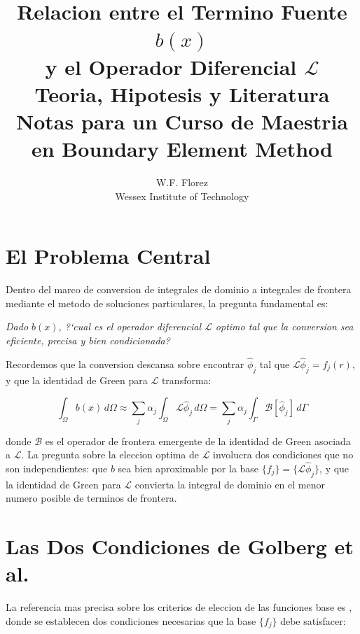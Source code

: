\documentclass[12pt,a4paper]{article}
\title{\textbf{Relacion entre el Termino Fuente $b(x)$\\
y el Operador Diferencial $\mathcal{L}$}\\[0.5em]
\large Teoria, Hipotesis y Literatura\\[0.3em]
\normalsize Notas para un Curso de Maestria en Boundary Element Method}
\author{W.F. Florez\\
\small Wessex Institute of Technology}
\date{}
\begin{document}
\maketitle
\tableofcontents
\newpage

\section{El Problema Central}

Dentro del marco de conversion de integrales de dominio a integrales de frontera
mediante el metodo de soluciones particulares, la pregunta fundamental es:

\medskip
\begin{center}
\textit{Dado $b(x)$, ?`cual es el operador diferencial $\mathcal{L}$ optimo tal
que la conversion sea eficiente, precisa y bien condicionada?}
\end{center}
\medskip

Recordemos que la conversion descansa sobre encontrar $\hat{\phi}_j$ tal que
$\mathcal{L}\hat{\phi}_j = f_j(r)$, y que la identidad de Green para $\mathcal{L}$
transforma:

\begin{equation}
    \int_\Omega b(x)\, d\Omega \approx
    \sum_j \alpha_j \int_\Omega \mathcal{L}\hat{\phi}_j\, d\Omega
    = \sum_j \alpha_j \int_\Gamma \mathcal{B}[\hat{\phi}_j]\, d\Gamma
    \label{eq:conversion}
\end{equation}

donde $\mathcal{B}$ es el operador de frontera emergente de la identidad de Green
asociada a $\mathcal{L}$. La pregunta sobre la eleccion optima de $\mathcal{L}$
involucra dos condiciones que no son independientes: que $b$ sea bien aproximable
por la base $\{f_j\} = \{\mathcal{L}\hat{\phi}_j\}$, y que la identidad de Green
para $\mathcal{L}$ convierta la integral de dominio en el menor numero posible de
terminos de frontera.

\section{Las Dos Condiciones de Golberg et al.}

La referencia mas precisa sobre los criterios de eleccion de las funciones base
es \cite{golberg1998comments}, donde se establecen dos condiciones necesarias que
la base $\{f_j\}$ debe satisfacer:
\end{document}
